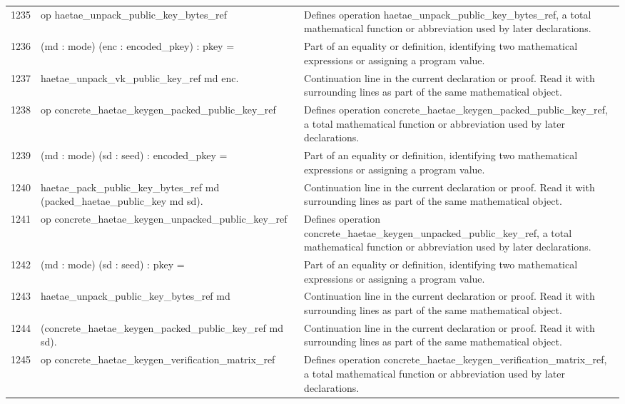 \documentclass[10pt]{article}
\begin{document}
\begin{longtable}{r L{0.53\textwidth} L{0.37\textwidth}}
1235 & {\ttfamily\scriptsize op haetae\_unpack\_public\_key\_bytes\_ref} & Defines operation haetae\_unpack\_public\_key\_bytes\_ref, a total mathematical function or abbreviation used by later declarations. \\
1236 & {\ttfamily\scriptsize    (md : mode) (enc : encoded\_pkey) : pkey =} & Part of an equality or definition, identifying two mathematical expressions or assigning a program value. \\
1237 & {\ttfamily\scriptsize   haetae\_unpack\_vk\_public\_key\_ref md enc.} & Continuation line in the current declaration or proof.  Read it with surrounding lines as part of the same mathematical object. \\
1238 & {\ttfamily\scriptsize op concrete\_haetae\_keygen\_packed\_public\_key\_ref} & Defines operation concrete\_haetae\_keygen\_packed\_public\_key\_ref, a total mathematical function or abbreviation used by later declarations. \\
1239 & {\ttfamily\scriptsize    (md : mode) (sd : seed) : encoded\_pkey =} & Part of an equality or definition, identifying two mathematical expressions or assigning a program value. \\
1240 & {\ttfamily\scriptsize   haetae\_pack\_public\_key\_bytes\_ref md (packed\_haetae\_public\_key md sd).} & Continuation line in the current declaration or proof.  Read it with surrounding lines as part of the same mathematical object. \\
1241 & {\ttfamily\scriptsize op concrete\_haetae\_keygen\_unpacked\_public\_key\_ref} & Defines operation concrete\_haetae\_keygen\_unpacked\_public\_key\_ref, a total mathematical function or abbreviation used by later declarations. \\
1242 & {\ttfamily\scriptsize    (md : mode) (sd : seed) : pkey =} & Part of an equality or definition, identifying two mathematical expressions or assigning a program value. \\
1243 & {\ttfamily\scriptsize   haetae\_unpack\_public\_key\_bytes\_ref md} & Continuation line in the current declaration or proof.  Read it with surrounding lines as part of the same mathematical object. \\
1244 & {\ttfamily\scriptsize     (concrete\_haetae\_keygen\_packed\_public\_key\_ref md sd).} & Continuation line in the current declaration or proof.  Read it with surrounding lines as part of the same mathematical object. \\
1245 & {\ttfamily\scriptsize op concrete\_haetae\_keygen\_verification\_matrix\_ref} & Defines operation concrete\_haetae\_keygen\_verification\_matrix\_ref, a total mathematical function or abbreviation used by later declarations. \\

\end{longtable}
\end{document}
